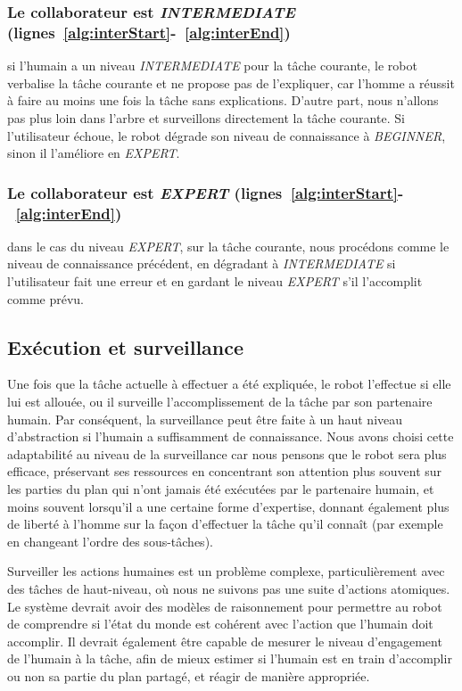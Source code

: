 \documentclass[a4paper,11pt,twoside]{StyleThese}
\begin{document}
\subsubsection{Le collaborateur est \textit{INTERMEDIATE} (lignes~\ref{alg:interStart}-~\ref{alg:interEnd})} si l'humain a un niveau  \textit{INTERMEDIATE} pour la tâche courante, le robot verbalise la tâche courante et ne propose pas de l'expliquer, car l'homme a réussit à faire au moins une fois la tâche sans explications. D'autre part, nous n'allons pas plus loin dans l'arbre et surveillons directement la tâche courante. Si l'utilisateur échoue, le robot dégrade son niveau de connaissance à \textit{BEGINNER}, sinon il l'améliore en \textit{EXPERT}.

\subsubsection{Le collaborateur est \textit{EXPERT} (lignes~\ref{alg:interStart}-~\ref{alg:interEnd})} dans le cas du niveau \textit{EXPERT}, sur la tâche courante, nous procédons comme le niveau de connaissance précédent, en dégradant à \textit{INTERMEDIATE} si l'utilisateur fait une erreur et en gardant le niveau \textit{EXPERT} s'il l'accomplit comme prévu.

\subsection{Exécution et surveillance}
Une fois que la tâche actuelle à effectuer a été expliquée, le robot l'effectue si elle lui est allouée, ou il surveille l'accomplissement de la tâche par son partenaire humain. Par conséquent, la surveillance peut être faite à un haut niveau d'abstraction si l'humain a suffisamment de connaissance.
Nous avons choisi cette adaptabilité au niveau de la surveillance car nous pensons que le robot sera plus efficace, préservant ses ressources en concentrant son attention plus souvent sur les parties du plan qui n'ont jamais été exécutées par le partenaire humain, et moins souvent lorsqu'il a une certaine forme d'expertise, donnant également plus de liberté à l'homme sur la façon d'effectuer la tâche qu'il connaît (par exemple en changeant l'ordre des sous-tâches).

Surveiller les actions humaines est un problème complexe, particulièrement avec des tâches de haut-niveau, où nous ne suivons pas une suite d'actions atomiques. Le système devrait avoir des modèles de raisonnement pour permettre au robot de comprendre si l'état du monde est cohérent avec l'action que l'humain doit accomplir. Il devrait également être capable de mesurer le niveau d'engagement de l'humain à la tâche, afin de mieux estimer si l'humain est en train d'accomplir ou non sa partie du plan partagé, et réagir de manière appropriée.
\end{document}
